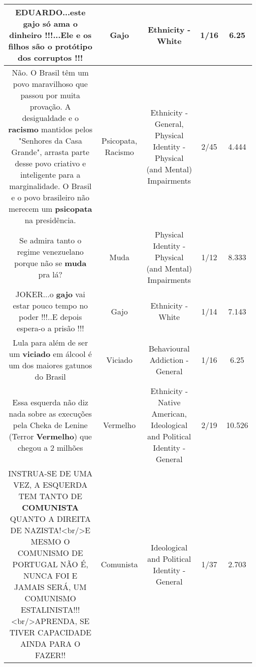\documentclass[11pt]{article}
\newlength\mylength
\begin{document}
\begin{center}
\begin{longtable}{|C{.65\mylength}|C{.30\mylength}|C{.12\mylength}|C{.12\mylength}|C{.12\mylength}|}
  \small EDUARDO...este \textbf{gajo} só ama o dinheiro !!!...Ele e os filhos são o protótipo dos corruptos !!!\normalsize   & Gajo & Ethnicity - White & 1/16 & 6.25 \\  \hline
  \small Não. O Brasil têm um povo maravilhoso que passou por muita provação. A desigualdade e o \textbf{racismo} mantidos pelos "Senhores da Casa Grande", arrasta parte desse povo criativo e inteligente para a marginalidade. O Brasil e o povo brasileiro não merecem um \textbf{psicopata} na presidência.\normalsize   & Psicopata, Racismo & Ethnicity - General, Physical Identity - Physical (and Mental) Impairments & 2/45 & 4.444 \\  \hline
  \small Se admira tanto o regime venezuelano porque não se \textbf{muda} pra lá?\normalsize   & Muda & Physical Identity - Physical (and Mental) Impairments & 1/12 & 8.333 \\  \hline
  \small JOKER...o \textbf{gajo} vai estar pouco tempo no poder !!!..E depois espera-o a prisão !!!\normalsize   & Gajo & Ethnicity - White & 1/14 & 7.143 \\  \hline
  \small Lula para além de ser um \textbf{viciado} em álcool é um dos maiores gatunos do Brasil\normalsize   & Viciado & Behavioural Addiction - General & 1/16 & 6.25 \\  \hline
  \small Essa esquerda não diz nada sobre as execuções pela Cheka de Lenine (Terror \textbf{V\textbf{ermelho}}) que chegou a 2 milhões\normalsize   & Vermelho & Ethnicity - Native American, Ideological and Political Identity - General & 2/19 & 10.526 \\  \hline
  \small INSTRUA-SE DE UMA VEZ, A ESQUERDA TEM TANTO DE \textbf{COMUNISTA} QUANTO A DIREITA DE NAZISTA!<br/>E MESMO O COMUNISMO DE PORTUGAL NÃO É, NUNCA FOI E JAMAIS SERÁ, UM COMUNISMO ESTALINISTA!!!<br/>APRENDA, SE TIVER CAPACIDADE AINDA PARA O FAZER!!\normalsize   & Comunista & Ideological and Political Identity - General & 1/37 & 2.703 \\  \hline

\end{longtable}
\end{center}
\end{document}
